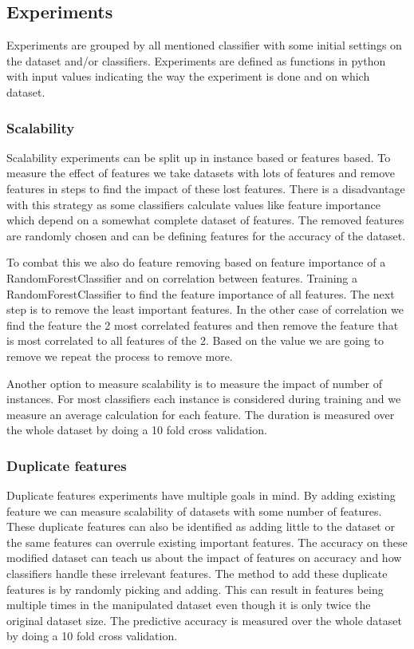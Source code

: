 \documentclass[a4paper,10pt]{article}
\begin{document}
\subsection{Experiments}
Experiments are grouped by all mentioned classifier with some initial settings on the dataset and/or classifiers. Experiments are defined as functions in python with input values indicating the way the experiment is done and on which dataset.
\subsubsection{Scalability}
Scalability experiments can be split up in instance based or features based. To measure the effect of features we take datasets with lots of features and remove features in steps to find the impact of these lost features. There is a disadvantage with this strategy as some classifiers calculate values like feature importance which depend on a somewhat complete dataset of features. The removed features are randomly chosen and can be defining features for the accuracy of the dataset. 

To combat this we also do feature removing based on feature importance of a RandomForestClassifier and on correlation between features. Training a RandomForestClassifier to find the feature importance of all features. The next step is to remove the least important features. In the other case of correlation we find the feature the 2 most correlated features and then remove the feature that is most correlated to all features of the 2. Based on the value we are going to remove we repeat the process to remove more.


Another option  to measure scalability is to measure the impact of number of instances. For most classifiers each instance is considered during training and we measure an average calculation for each feature. The duration is measured over the whole dataset by doing a 10 fold cross validation.

\subsubsection{Duplicate features}
Duplicate features experiments have multiple goals in mind. By adding existing feature we can measure scalability of datasets with some number of features. These duplicate features can also be identified as adding little to the dataset or the same features can overrule existing important features. The accuracy on these modified dataset
can teach us about the impact of features on accuracy and how classifiers handle these irrelevant features. The method to add these duplicate features is by randomly picking and adding. This can result in features being multiple times in the manipulated  dataset even though it is only twice the original dataset size. The predictive accuracy is measured over the whole dataset by doing a 10 fold cross validation.
\end{document}
